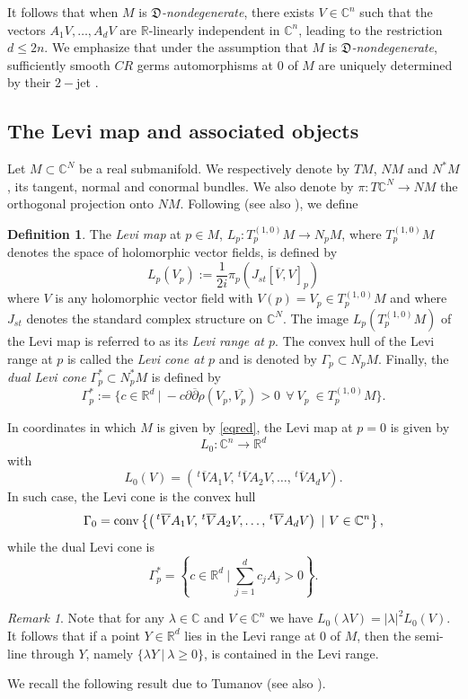 \documentclass[12pt]{amsart}
\newcommand{\C}{\mathbb C}
\newcommand{\R}{\mathbb R}
\newcommand{\transp}{\,^t}
\theoremstyle{remark}
\newtheorem{remark}[theo]{Remark}
\theoremstyle{example}
\theoremstyle{definition}
\newtheorem{defi}[theo]{Definition}
\numberwithin{equation}{section}
\begin{document}
It  follows that when $M$ is {\it$\mathfrak{D}$-nondegenerate},   there exists $V \in \C^n$  such that the vectors $A_1V,\ldots,A_dV$ are $\R$-linearly independent in $\C^n$, leading to the restriction $d\leq 2n$. We emphasize that under the assumption that $M$ is {\it$\mathfrak{D}$-nondegenerate}, sufficiently smooth $CR$ germs automorphisms at $0$ of $M$ are uniquely determined by their $2-$jet \cite{be-me}.  

 

\subsection{The Levi map and associated objects}

Let $M \subset \C^{N}$ be a real submanifold. We respectively denote by $TM$, $NM$ and $N^*M$, its tangent, normal and conormal bundles. We also denote by $\pi: T{\C^N} \to NM$ the orthogonal projection onto $NM$. Following \cite{ber, bo} (see also \cite{bl-me}), we define 
\begin{defi}
The {\it Levi map} at $p \in M$, $L_p: T_p^{(1,0)}M \to N_pM$, where $T_p^{(1,0)}M$ denotes the space of holomorphic vector fields, is defined by 
$$L_p(V_p):=\frac{1}{2i}\pi_p\left(J_{st}\left[\overline{V},V\right]_p\right)$$
where $V$ is any holomorphic vector field with $V(p)=V_p \in T_p^{(1,0)}M$ and where $J_{st}$ denotes the standard complex structure on $\C^N$.  
The image $L_p\left(T_p^{(1,0)}M\right)$ of the Levi map is referred to as its {\it Levi range at $p$}. The convex  hull of the Levi range at $p$ is called the {\it Levi cone at $p$} and is denoted by $\Gamma_p\subset N_pM$. Finally, the {\it dual Levi cone} $\Gamma^*_p\subset N^*_pM$ is defined by 
$$\Gamma^*_p:=\{ c \in\R^d \ | \ -c\partial \overline{\partial}\rho\left(V_p,\overline{V_p}\right)>0 \  \ \forall \ V_p \ \in T_p^{(1,0)}M\}.$$
\end{defi}
In coordinates in which $M$ is given by \eqref{eqred}, the Levi map at $p=0$ is given by $$L_0: \C^n \to \R^d$$ with
$$L_0(V)=\left(\transp \overline{V}A_1V,\transp \overline{V}A_2V,\ldots,\transp \overline{V}A_dV\right).$$
In such case, the Levi cone is the convex hull 
$$\Gamma_0={\rm conv} \left\{\left(\transp \overline{V}A_1V,\transp \overline{V}A_2V,\ldots,\transp \overline{V}A_dV\right) \ | \ V\in \C^n \right\},$$
while the  dual Levi cone is 
$$\Gamma^*_p=\left\{ c \in\R^d \ | \ \sum_{j=1}^dc_jA_j>0 \right\}.$$  
\begin{remark}
Note that for any $\lambda \in \C$ and $V \in \C^n$ we have $L_0(\lambda V)=|\lambda|^2L_0(V)$. It follows that if a point $Y \in \R^d$ lies in the Levi range at $0$ of $M$, then the semi-line through $Y$, namely $\{ \lambda Y \ | \ \lambda \geq 0\}$,  is contained in the Levi range.
\end{remark}     
We recall the following result due to Tumanov \cite{tu} (see also \cite{bl-me}).
\end{document}
